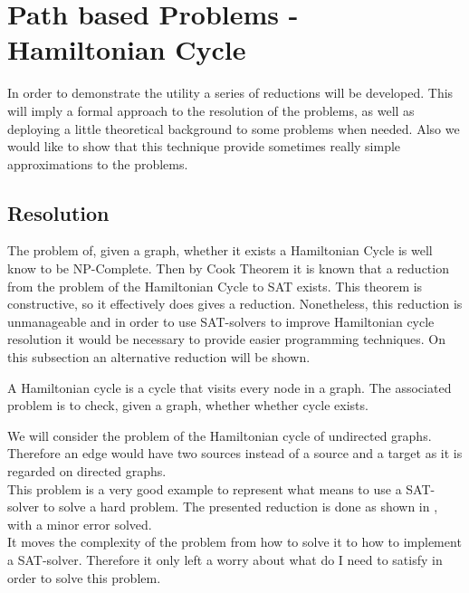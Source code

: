 \section{Path based Problems - Hamiltonian Cycle}


 In order to demonstrate the utility a series of reductions will be developed. This will imply a formal approach to the resolution of the problems, as well as deploying a little theoretical background to some problems when needed. Also we would like to show that this technique provide sometimes really simple approximations to the problems.\\


\subsection{Resolution}

The problem of, given a graph, whether it exists  a Hamiltonian Cycle is well know to be NP-Complete. Then by Cook Theorem it is known that a reduction from the problem of the Hamiltonian Cycle to SAT exists. This theorem is constructive, so it effectively does gives a reduction. Nonetheless, this reduction is unmanageable and in order to use SAT-solvers to improve Hamiltonian cycle resolution it would be necessary to provide easier programming techniques. On this subsection an alternative reduction will be shown.

\begin{definition}
  A Hamiltonian cycle is a cycle that visits every node in a graph. The associated problem is to check, given a graph, whether whether cycle exists.
\end{definition}

We will consider the problem of the Hamiltonian cycle of undirected graphs. Therefore an edge would have two sources instead of a source and a target as it is regarded on directed graphs.\\

This problem is a very good example to represent what means to use a SAT-solver to solve a hard problem. The presented reduction is done as shown in \cite{49593}, with a minor error solved.\\


It moves the complexity of the problem from how to solve it to how to implement a SAT-solver. Therefore it only left a worry about what do I need to satisfy in order to solve this problem.\\



